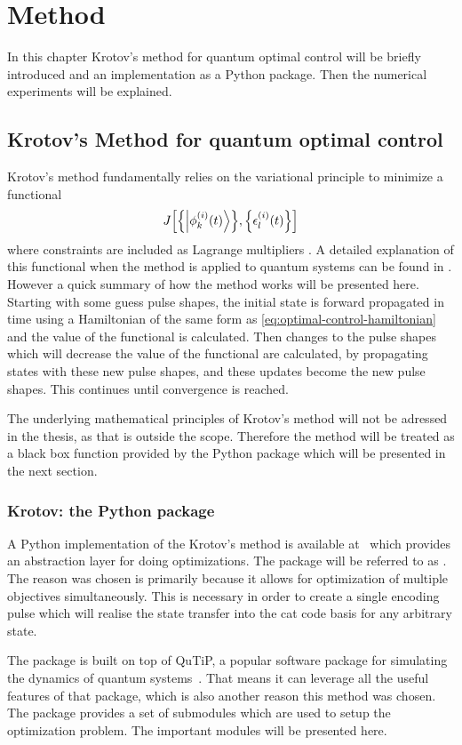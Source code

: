 \documentclass[main.tex]{subfiles}
\begin{document}
\chapter{Method}
In this chapter Krotov's method for quantum optimal control will be briefly introduced and an implementation as a Python package.
Then the numerical experiments will be explained.

\section{Krotov's Method for quantum optimal control}
Krotov's method fundamentally relies on the variational principle to minimize a functional \[ J\qty[\qty{\ket{\phi^{(i)}_k(t)}},\qty{\epsilon_l^{(i)}(t)}] \] where constraints are included as Lagrange multipliers \cite{goerz_krotov:_2019}.
A detailed explanation of this functional when the method is applied to quantum systems can be found in \cite{reich_monotonically_2012}.
However a quick summary of how the method works will be presented here.
Starting with some guess pulse shapes, the initial state is forward propagated in time using a Hamiltonian of the same form as \cref{eq:optimal-control-hamiltonian} and the value of the functional is calculated.
Then changes to the pulse shapes which will decrease the value of the functional are calculated, by propagating states with these new pulse shapes, and these updates become the new pulse shapes.
This continues until convergence is reached.

The underlying mathematical principles of Krotov's method will not be adressed in the thesis, as that is outside the scope.
Therefore the method will be treated as a black box function provided by the Python package which will be presented in the next section.

\subsection{Krotov: the Python package}
A Python implementation of the Krotov's method is available at~\cite{goerz_krotov:_2019} which provides an abstraction layer for doing optimizations.
The package will be referred to as \krotov{}.
The reason \krotov{} was chosen is primarily because it allows for optimization of multiple objectives simultaneously.
This is necessary in order to create a single encoding pulse which will realise the state transfer into the cat code basis for any arbitrary state.

The package is built on top of QuTiP, a popular software package for simulating the dynamics of quantum systems~\cite{johansson_qutip_2013}.
That means it can leverage all the useful features of that package, which is also another reason this method was chosen.
The package provides a set of submodules which are used to setup the optimization problem.
The important modules will be presented here.
\end{document}
